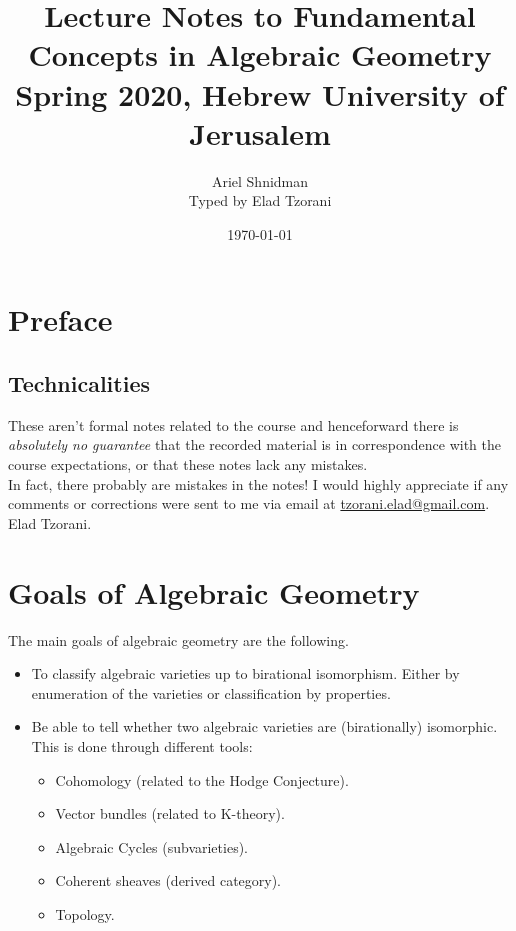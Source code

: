 \documentclass[10pt,a4paper,twoside,openany,hidelinks]{book}
\title{Lecture Notes to Fundamental Concepts in Algebraic Geometry \\ \large{Spring 2020, Hebrew University of Jerusalem}}
\author{Ariel Shnidman\\ \large{Typed by Elad Tzorani}}
\date{\today}
\begin{document}
\frontmatter
{}
\tableofcontents
\countlectures
\newpage

\chapter*{Preface}
 

\section*{Technicalities}

These aren't formal notes related to the course and henceforward there is \emph{absolutely no guarantee} that the recorded material is in correspondence with the course expectations, or that these notes lack any mistakes.\\
In fact, there probably are mistakes in the notes! I would highly appreciate if any comments or corrections were sent to me via email at \href{mailto:tzorani.elad@gmail.com}{tzorani.elad@gmail.com}.\\
Elad Tzorani.

\mainmatter

\chapter*{Goals of Algebraic Geometry}

The main goals of algebraic geometry are the following.

\begin{itemize}
\item To classify algebraic varieties up to birational isomorphism.
Either by enumeration of the varieties or classification by properties.
\item
Be able to tell whether two algebraic varieties are (birationally) isomorphic. This is done through different tools:
\begin{itemize}
\item Cohomology (related to the Hodge Conjecture).
\item Vector bundles (related to K-theory).
\item Algebraic Cycles (subvarieties).
\item Coherent sheaves (derived category).
\item Topology.
\end{itemize}
\end{itemize}
\end{document}
